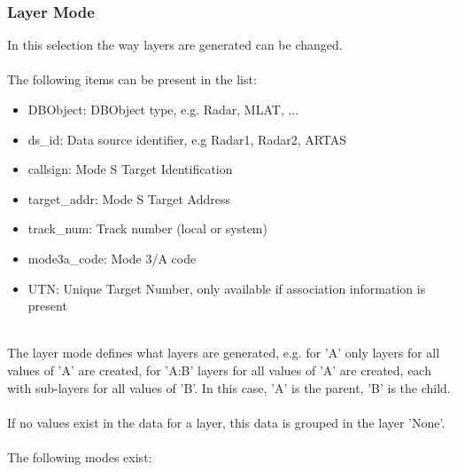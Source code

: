\subsubsection{Layer Mode}
\label{sec:layer_mode}

In this selection the way layers are generated can be changed. \\\\

The following items can be present in the list:\\

\begin{itemize}
 \item DBObject: DBObject type, e.g. Radar, MLAT, ...
 \item ds\_id: Data source identifier, e.g Radar1, Radar2, ARTAS
 \item callsign: Mode S Target Identification
 \item target\_addr: Mode S Target Address
 \item track\_num: Track number (local or system)
 \item mode3a\_code: Mode 3/A code
 \item UTN: Unique Target Number, only available if association information is present
\end{itemize}
\ \\

The layer mode defines what layers are generated, e.g. for 'A' only layers for all values of 'A' are created, for 'A:B' layers for all values of 'A' are created, each with sub-layers for all values of 'B'. In this case, 'A' is the parent, 'B' is the child. \\\\

If no values exist in the data for a layer, this data is grouped in the layer 'None'.\\\\

The following modes exist: \\

